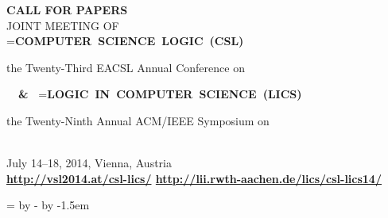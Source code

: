 \documentclass[oneside]{article}
\begin{document}
\pagestyle{empty}
\raggedbottom

\newbox\nbox
\newcommand\titlestyle{\large\bfseries}

\begin{center}
  \textbf{CALL FOR PAPERS} \\[1ex]
  {\large JOINT MEETING OF} \\[1ex]
  \setbox\nbox=\hbox{\titlestyle COMPUTER SCIENCE LOGIC (CSL)}
  \begin{minipage}[b]{\wd\nbox} \centering
    the Twenty-Third EACSL Annual Conference on \\[.2ex]
    {\box\nbox}
  \end{minipage}
  \ {\titlestyle\ \&\ }
  \setbox\nbox=\hbox{\titlestyle LOGIC IN COMPUTER SCIENCE (LICS)}
  \begin{minipage}[b]{\wd\nbox} \centering
    the Twenty-Ninth Annual ACM/IEEE Symposium on \\[.2ex]
    {\box\nbox}
  \end{minipage}
  \\[1ex]
  July 14--18, 2014, Vienna, Austria \\[1ex]
  {\bfseries \url{http://vsl2014.at/csl-lics/}
             \quad
             \url{http://lii.rwth-aachen.de/lics/csl-lics14/}
  }
\end{center}

\vspace{1mm}

\newdimen\leftcol
\leftcol=4.7cm
\newdimen\rightcol
\rightcol=\linewidth
\advance\rightcol by -\leftcol
\advance\rightcol by -1.5em
\let\oldframebox=\framebox
\let\framebox=\relax

\end{document}
